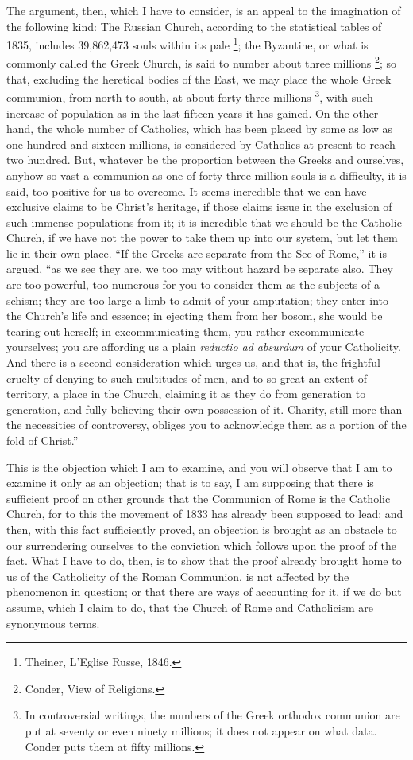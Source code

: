 The argument, then, which I have to consider, is an appeal to the
imagination of the following kind: The Russian Church, according to
the statistical tables of 1835, includes 39,862,473 souls within its
pale \footnote{Theiner, L'Eglise Russe, 1846.}; the Byzantine, or
what is commonly called the Greek Church, is said to number about
three millions \footnote{Conder, View of Religions.}; so
that, excluding the heretical bodies of the East, we may place the
whole Greek communion, from north to south, at about forty-three
millions \footnote{In controversial writings, the numbers of
the Greek orthodox communion are put at seventy or even ninety
millions; it does not appear on what data. Conder puts them at fifty
millions.}, with such
increase of population as in the last fifteen years it has gained. On
the other hand, the whole number of Catholics, which has been placed
by some as low as one hundred and sixteen millions, is considered by
Catholics at present to reach two hundred. But, whatever be the
proportion between the Greeks and ourselves, anyhow so vast a
communion as one of forty-three million souls is a difficulty, it is
said, too positive for us to overcome. It seems incredible that we can
have exclusive claims to be Christ's heritage, if those claims issue
in the exclusion of such immense populations from it; it is incredible
that we should be the Catholic Church, if we have not the power to
take them up into our system, but let them lie in their own place.
``If the Greeks are separate from the See of Rome,'' it is
argued, ``as we see they are, we too may without hazard be separate
also. They are too powerful, too numerous for you to consider them as
the subjects of a schism; they are too large a limb to admit of your
amputation; they enter into the Church's life and essence; in ejecting
them from her bosom, she would be tearing out herself; in
excommunicating them, you rather excommunicate yourselves; you are
affording us a plain \emph{reductio ad absurdum} of your Catholicity.
And there is a second consideration which urges us, and that is, the
frightful cruelty of denying to such multitudes of men, and to so
great an extent of territory, a place in the Church, claiming it as
they do from generation to generation, and fully believing their own
possession of it. Charity, still more than the necessities of
controversy, obliges you to acknowledge them as a portion of the fold
of Christ.''

This is the objection which I am to examine, and you will observe
that I am to examine it only as an objection; that is to say, I am
supposing that there is sufficient proof on other grounds that the
Communion of Rome is the Catholic Church, for to this the movement of
1833 has already been supposed to lead; and then, with this fact
sufficiently proved, an objection is brought as an obstacle to our
surrendering ourselves to the conviction which follows upon the proof
of the fact. What I have to do, then, is to show that the proof
already brought home to us of the Catholicity of the Roman Communion,
is not affected by the phenomenon in question; or that there are ways
of accounting for it, if we do but assume, which I claim to do, that
the Church of Rome and Catholicism are synonymous terms.

